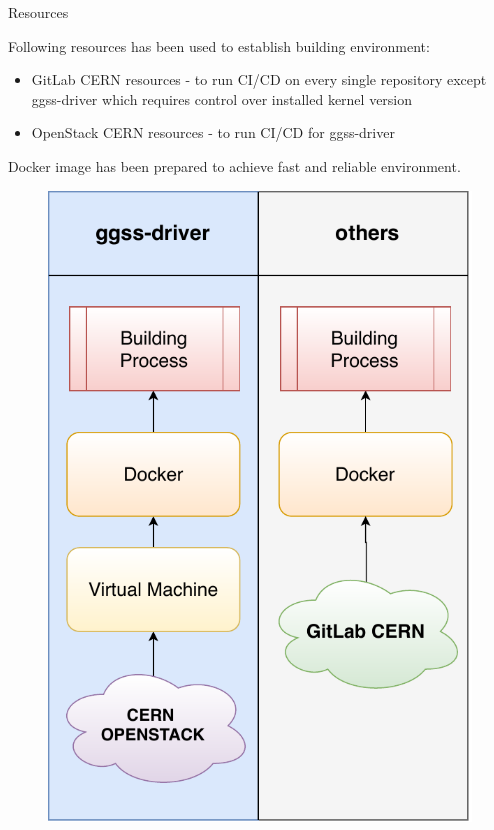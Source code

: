 \documentclass[10pt]{beamer}
\begin{document}
\begin{frame}{Resources}
\begin{minipage}{0.65\linewidth}
	Following resources has been used to establish building environment:
	\begin{itemize}
		\item GitLab CERN resources - to run CI/CD on every single repository except ggss-driver which requires control over installed kernel version
		\item OpenStack CERN resources - to run CI/CD for ggss-driver
	\end{itemize}
	Docker image has been prepared to achieve fast and reliable environment.
\end{minipage}
\begin{minipage}{0.32\linewidth}
	\begin{figure}
		\centering
		\includegraphics[width=\linewidth]{resources/buildComp}
	\end{figure}
\end{minipage}
\end{frame}


\begin{frame}
\end{frame}
\end{document}
